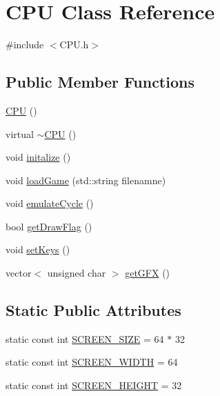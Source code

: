 \hypertarget{classCPU}{\section{C\-P\-U Class Reference}
\label{classCPU}
}


{\ttfamily \#include $<$C\-P\-U.\-h$>$}

\subsection*{Public Member Functions}
\begin{DoxyCompactItemize}
\item 
\hyperlink{classCPU_a2fdd8153d0979ccad9ed8452897267f4}{C\-P\-U} ()
\item 
virtual \hyperlink{classCPU_aa32e0ed85bebabb167ace09050d20707}{$\sim$\-C\-P\-U} ()
\item 
void \hyperlink{classCPU_ad78f88b03032587507f0e48a58866560}{initalize} ()
\item 
void \hyperlink{classCPU_ad40d5c22c7df265ed603a33843fa3ee4}{load\-Game} (std\-::string filenamne)
\item 
void \hyperlink{classCPU_a039ffcdbd6bd2c41bd8362b6e546b0d8}{emulate\-Cycle} ()
\item 
bool \hyperlink{classCPU_a68658621a98bf997bfd736c9c64f3fac}{get\-Draw\-Flag} ()
\item 
void \hyperlink{classCPU_a9bbdc09cee677e45c26214fb731e0620}{set\-Keys} ()
\item 
vector$<$ unsigned char $>$ \hyperlink{classCPU_a9e192437ba952fb9f7df689642b7a7aa}{get\-G\-F\-X} ()
\end{DoxyCompactItemize}
\subsection*{Static Public Attributes}
\begin{DoxyCompactItemize}
\item 
static const int \hyperlink{classCPU_a06c3d3ec8c47f48c437256e8910840a1}{S\-C\-R\-E\-E\-N\-\_\-\-S\-I\-Z\-E} = 64 $\ast$ 32
\item 
static const int \hyperlink{classCPU_a8feada83f7887e1a418c4dd308fbd4a9}{S\-C\-R\-E\-E\-N\-\_\-\-W\-I\-D\-T\-H} = 64
\item 
static const int \hyperlink{classCPU_a0c73376f8f7ed2cdcdc97967433e23b7}{S\-C\-R\-E\-E\-N\-\_\-\-H\-E\-I\-G\-H\-T} = 32
\end{DoxyCompactItemize}
